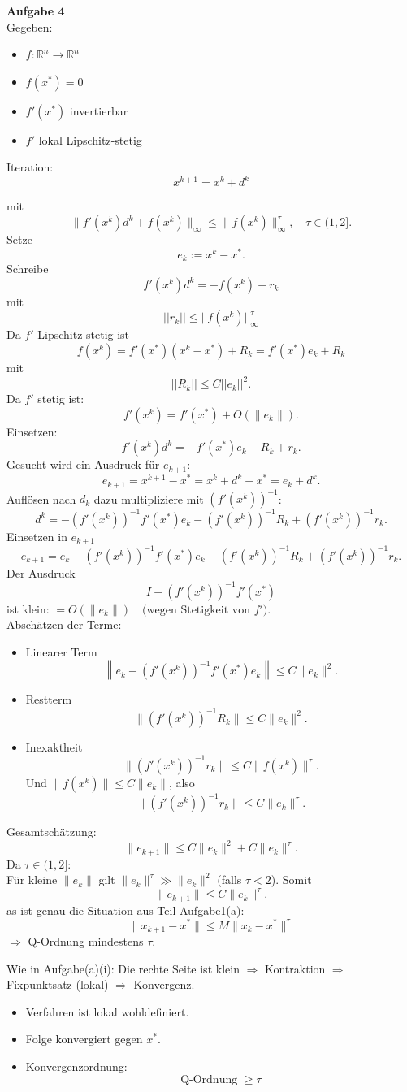 \documentclass[a4paper,12pt]{article}
\begin{document}
\raggedright
\doublespacing
\noindent\textbf{Aufgabe 4} \\
Gegeben:
\begin{itemize}
    \item $f : \mathbb{R}^n \to \mathbb{R}^n$
    \item $f(x^*) = 0$
    \item $f'(x^*)$ invertierbar
    \item $f'$ lokal Lipschitz-stetig
\end{itemize}

Iteration:
\[
x^{k+1} = x^k + d^k
\]

mit
\[
\|f'(x^k)d^k + f(x^k)\|_\infty \le \|f(x^k)\|_\infty^\tau, \quad \tau \in (1, 2].
\]
Setze 
$$e_k:=x^k - x^*.$$
Schreibe
$$f'(x^k)d^k=-f(x^k)+r_k$$
mit
$$||r_k|| \leq ||f(x^k)||_{\infty}^{\tau}$$
Da $f'$ Lipschitz-stetig ist
$$
f(x^k)=f'(x^*)(x^k-x^*)+R_k=f'(x^*)e_k +R_k
$$
mit
$$||R_k|| \leq C||e_k||^2.
$$
Da $f'$ stetig ist:
$$
f'(x^k) = f'(x^*) + O(\| e_k \|).
$$
Einsetzen:
$$
f'(x^k)d^k = -f'(x^*) e_k - R_k + r_k.
$$
Gesucht wird ein Ausdruck für $e_{k+1}$: 
$$
\boxed{e_{k+1} = x^{k+1} - x^* = x^k + d^k - x^* = e_k + d^k.}
$$
Auflösen nach $d_k$ dazu
multipliziere mit $(f'(x^k))^{-1}$:
$$
d^k = -(f'(x^k))^{-1} f'(x^*) e_k - (f'(x^k))^{-1} R_k + (f'(x^k))^{-1} r_k.
$$
Einsetzen in $e_{k+1}$
$$
e_{k+1} = e_k - (f'(x^k))^{-1} f'(x^*) e_k - (f'(x^k))^{-1} R_k + (f'(x^k))^{-1} r_k.
$$
Der Ausdruck
$$
I - (f'(x^k))^{-1} f'(x^*)
$$
ist klein:
$= O(\| e_k \|) \quad \text{(wegen Stetigkeit von $f'$)}$.\\
Abschätzen der Terme:
\begin{itemize}
  \item Linearer Term
$$
\left\| e_k - (f'(x^k))^{-1} f'(x^*) e_k \right\| \le C \| e_k \|^2.
$$
\item  Restterm
$$
\| (f'(x^k))^{-1} R_k \| \le C \| e_k \|^2.
$$
\item Inexaktheit
$$
\| (f'(x^k))^{-1} r_k \| \le C \| f(x^k) \|^\tau.
$$
Und $\| f(x^k) \| \le C \| e_k \|$, also
$$
\| (f'(x^k))^{-1} r_k \| \le C \| e_k \|^\tau.
$$
\end{itemize}
Gesamtschätzung:
$$
\| e_{k+1} \| \le C \| e_k \|^2 + C \| e_k \|^\tau.
$$
Da $\tau \in (1,2]$: \\
Für kleine $\| e_k \|$ gilt $\| e_k \|^\tau \gg \| e_k \|^2$ (falls $\tau < 2$). Somit
$$
\| e_{k+1} \| \le C \| e_k \|^\tau.
$$
as ist genau die Situation aus Teil Aufgabe1(a):
$$
\| x_{k+1} - x^* \| \le M \| x_k - x^* \|^\tau
$$
$\Rightarrow$ Q-Ordnung mindestens $\tau$.

Wie in Aufgabe(a)(i): Die rechte Seite ist klein $\Rightarrow$ Kontraktion $\Rightarrow$ Fixpunktsatz (lokal) $\Rightarrow$ Konvergenz.

\begin{itemize}
  \item Verfahren ist lokal wohldefiniert.
  \item Folge konvergiert gegen $x^*$.
  \item Konvergenzordnung:
    \[
    \boxed{\text{Q-Ordnung } \ge \tau}
    \]
\end{itemize}
\end{document}
